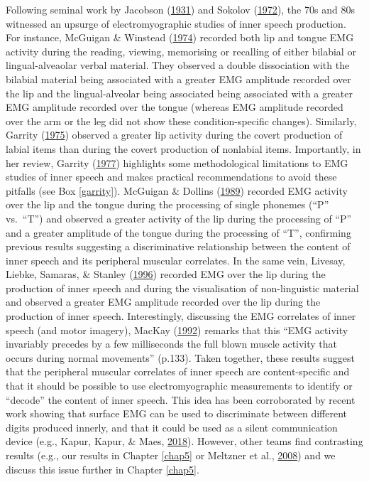 \documentclass[a4paper,12pt,twoside,onecolumn,openright,final,oldfontcommands]{memoir}
\begin{document}
Following seminal work by Jacobson (\protect\hyperlink{ref-jacobson_electrical_1931}{1931}) and Sokolov (\protect\hyperlink{ref-sokolov_inner_1972}{1972}), the 70s and 80s witnessed an upsurge of electromyographic studies of inner speech production. For instance, McGuigan \& Winstead (\protect\hyperlink{ref-mcguigan_discriminative_1974}{1974}) recorded both lip and tongue EMG activity during the reading, viewing, memorising or recalling of either bilabial or lingual-alveaolar verbal material. They observed a double dissociation with the bilabial material being associated with a greater EMG amplitude recorded over the lip and the lingual-alveolar being associated being associated with a greater EMG amplitude recorded over the tongue (whereas EMG amplitude recorded over the arm or the leg did not show these condition-specific changes). Similarly, Garrity (\protect\hyperlink{ref-garrity_measurement_1975}{1975}) observed a greater lip activity during the covert production of labial items than during the covert production of nonlabial items. Importantly, in her review, Garrity (\protect\hyperlink{ref-garrity_electromyography_1977}{1977}) highlights some methodological limitations to EMG studies of inner speech and makes practical recommendations to avoid these pitfalls (see Box \ref{garrity}). McGuigan \& Dollins (\protect\hyperlink{ref-mcguigan_patterns_1989}{1989}) recorded EMG activity over the lip and the tongue during the processing of single phonemes (\enquote{P} vs.~\enquote{T}) and observed a greater activity of the lip during the processing of \enquote{P} and a greater amplitude of the tongue during the processing of \enquote{T}, confirming previous results suggesting a discriminative relationship between the content of inner speech and its peripheral muscular correlates. In the same vein, Livesay, Liebke, Samaras, \& Stanley (\protect\hyperlink{ref-livesay_covert_1996}{1996}) recorded EMG over the lip during the production of inner speech and during the visualisation of non-linguistic material and observed a greater EMG amplitude recorded over the lip during the production of inner speech. Interestingly, discussing the EMG correlates of inner speech (and motor imagery), MacKay (\protect\hyperlink{ref-mackay_constraints_1992}{1992}) remarks that this \enquote{EMG activity invariably precedes by a few milliseconds the full blown muscle activity that occurs during normal movements} (p.133). Taken together, these results suggest that the peripheral muscular correlates of inner speech are content-specific and that it should be possible to use electromyographic measurements to identify or \enquote{decode} the content of inner speech. This idea has been corroborated by recent work showing that surface EMG can be used to discriminate between different digits produced innerly, and that it could be used as a silent communication device (e.g., Kapur, Kapur, \& Maes, \protect\hyperlink{ref-kapur_alterego_2018}{2018}). However, other teams find contrasting results (e.g., our results in Chapter \ref{chap5} or Meltzner et al., \protect\hyperlink{ref-meltzner_speech_2008}{2008}) and we discuss this issue further in Chapter \ref{chap5}.
\end{document}
